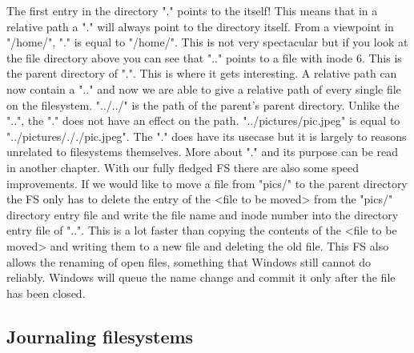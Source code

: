 The first entry in the directory "." points to the itself! This means that in a relative path a "."
will always point to the directory itself. From a viewpoint in "/home/", "." is equal to "/home/".
This is not very spectacular but if you look at the file directory above you can see that ".." points
to a file with inode 6. This is the parent directory of ".". This is where it gets interesting. A
relative path can now contain a ".." and now we are able to give a relative path of every single file
on the filesystem. "../../" is the path of the parent's parent directory. Unlike the "..", the "."
does not have an effect on the path. "../pictures/pic.jpeg" is equal to "../pictures/././pic.jpeg".
The "." does have its usecase but it is largely to reasons unrelated to filesystems themselves.
More about "." and its purpose can be read in another chapter. With our fully fledged FS there are
also some speed improvements. If we would like to move a file from "pics/" to the parent directory the
FS only has to delete the entry of the <file to be moved> from the "pics/" directory entry file and
write the file name and inode number into the directory entry file of "..". This is a lot faster than 
copying the contents of the <file to be moved> and writing them to a new file and deleting the old
file. This FS also allows the renaming of open files, something that Windows still cannot do reliably. Windows will queue the
name change and commit it only after the file has been closed.

\subsection{Journaling filesystems}

